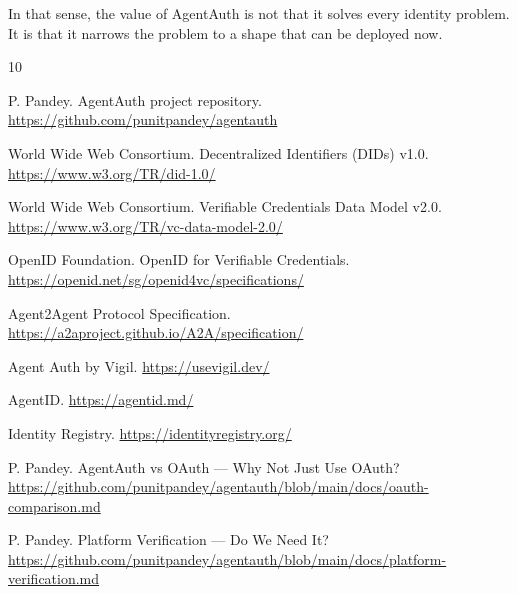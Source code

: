 \documentclass[11pt]{article}
\begin{document}
In that sense, the value of AgentAuth is not that it solves every identity problem. It is that it narrows the problem to a shape that can be deployed now.

\begin{thebibliography}{10}

P. Pandey.
\newblock AgentAuth project repository.
\newblock \url{https://github.com/punitpandey/agentauth}

World Wide Web Consortium.
\newblock Decentralized Identifiers (DIDs) v1.0.
\newblock \url{https://www.w3.org/TR/did-1.0/}

World Wide Web Consortium.
\newblock Verifiable Credentials Data Model v2.0.
\newblock \url{https://www.w3.org/TR/vc-data-model-2.0/}

OpenID Foundation.
\newblock OpenID for Verifiable Credentials.
\newblock \url{https://openid.net/sg/openid4vc/specifications/}

Agent2Agent Protocol Specification.
\newblock \url{https://a2aproject.github.io/A2A/specification/}

Agent Auth by Vigil.
\newblock \url{https://usevigil.dev/}

AgentID.
\newblock \url{https://agentid.md/}

Identity Registry.
\newblock \url{https://identityregistry.org/}

P. Pandey.
\newblock AgentAuth vs OAuth --- Why Not Just Use OAuth?
\newblock \url{https://github.com/punitpandey/agentauth/blob/main/docs/oauth-comparison.md}

P. Pandey.
\newblock Platform Verification --- Do We Need It?
\newblock \url{https://github.com/punitpandey/agentauth/blob/main/docs/platform-verification.md}

\end{thebibliography}
\end{document}
